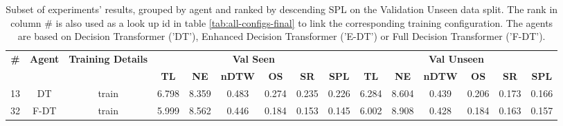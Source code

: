 \begin{table}
\centering
\caption{\label{tab:spatial_features}Subset of experiments' results, grouped by agent and ranked by descending SPL on the Validation Unseen data split. The rank in column \# is also used as a look up id in table \ref{tab:all-configs-final} to link the corresponding training configuration.     \newline The agents are based on Decision Transformer ('DT'), Enhanced Decision Transformer ('E-DT') or Full Decision Transformer ('F-DT').}
\begin{tabular}{@{\hskip3pt}c@{\hskip3pt}c@{\hskip3pt}c@{\hskip3pt}c@{\hskip3pt}c@{\hskip3pt}c@{\hskip3pt}c@{\hskip3pt}c@{\hskip3pt}c@{\hskip3pt}c@{\hskip3pt}c@{\hskip3pt}c@{\hskip3pt}c@{\hskip3pt}c@{\hskip3pt}c}
\toprule
\textbf{\#} & \textbf{Agent} & \textbf{Training Details} & \multicolumn{6}{c}{\textbf{Val Seen}} & \multicolumn{6}{c}{\textbf{Val Unseen}} \\
\cmidrule(l){4-9} \cmidrule(l){10-15} \textbf{~} &     \textbf{~} &                \textbf{~} &       \textbf{TL} & \textbf{NE} & \textbf{nDTW} & \textbf{OS} & \textbf{SR} & \textbf{SPL} &         \textbf{TL} & \textbf{NE} & \textbf{nDTW} & \textbf{OS} & \textbf{SR} & \textbf{SPL} \\
\midrule
         13 &             DT &                     train &             6.798 &       8.359 &         0.483 &       0.274 &       0.235 &        0.226 &               6.284 &       8.604 &         0.439 &       0.206 &       0.173 &        0.166 \\
         32 &           F-DT &                     train &             5.999 &       8.562 &         0.446 &       0.184 &       0.153 &        0.145 &               6.002 &       8.908 &         0.428 &       0.184 &       0.163 &        0.157 \\
\bottomrule
\end{tabular}
\end{table}
